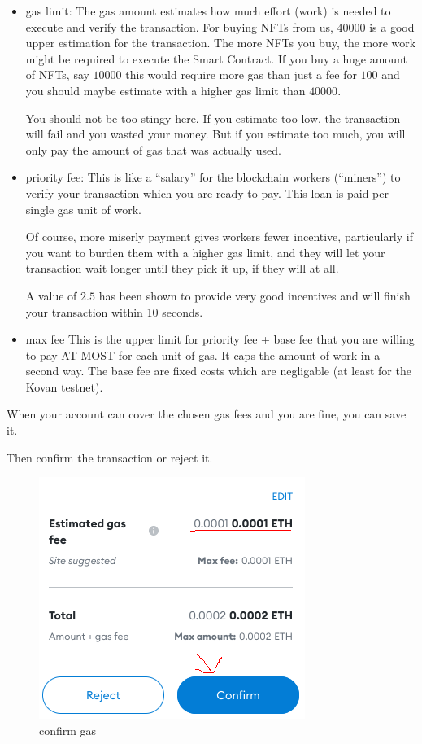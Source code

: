 \documentclass[
]{article}
\begin{document}
\begin{itemize}
\item
  gas limit: The gas amount estimates how much effort (work) is needed
  to execute and verify the transaction. For buying NFTs from us,
  \(40 000\) is a good upper estimation for the transaction. The more
  NFTs you buy, the more work might be required to execute the Smart
  Contract. If you buy a huge amount of NFTs, say \(10 000\) this would
  require more gas than just a fee for \(100\) and you should maybe
  estimate with a higher gas limit than \(40000\).

  You should not be too stingy here. If you estimate too low, the
  transaction will fail and you wasted your money. But if you estimate
  too much, you will only pay the amount of gas that was actually used.
\item
  priority fee: This is like a ``salary'' for the blockchain workers
  (``miners'') to verify your transaction which you are ready to pay.
  This loan is paid per single gas unit of work.

  Of course, more miserly payment gives workers fewer incentive,
  particularly if you want to burden them with a higher gas limit, and
  they will let your transaction wait longer until they pick it up, if
  they will at all.

  A value of \(2.5\) has been shown to provide very good incentives and
  will finish your transaction within 10 seconds.
\item
  max fee This is the upper limit for priority fee + base fee that you
  are willing to pay AT MOST for each unit of gas. It caps the amount of
  work in a second way. The base fee are fixed costs which are
  negligable (at least for the Kovan testnet).
\end{itemize}

When your account can cover the chosen gas fees and you are fine, you
can save it.

Then confirm the transaction or reject it.

\begin{figure}
\centering
\includegraphics{images/confirm_gas.png}
\caption{confirm gas}
\end{figure}\newpage
\end{document}

